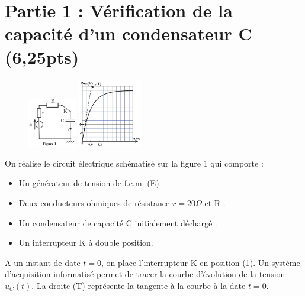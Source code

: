 \documentclass[12pt]{article}
\begin{document}
\section*{Partie 1 : Vérification de la capacité d'un condensateur C \dotfill(6,25pts)}

\begin{figure}
  \begin{center}
	  \vspace{-1cm}
	\includegraphics[width=0.19\textwidth]{./img/img01.png}
	\includegraphics[width=0.25\textwidth]{./img/img02.png}
  \end{center}
\end{figure}
On réalise le circuit électrique schématisé
sur la figure 1 qui comporte :
\begin{itemize}
\item Un générateur de tension de f.e.m. (E).
\item  Deux conducteurs ohmiques de
résistance $r =20\Omega$ et R .
\item Un condensateur de capacité C
initialement déchargé .
\item Un interrupteur K à double position.
\end{itemize}
A un instant de date $t =0$, on place l’interrupteur K en
position (1). Un système d’acquisition informatisé permet de
tracer la courbe d’évolution de la tension $u_C(t)$. La droite (T)
représente la tangente à la courbe à la date $t=0$.
\end{document}
